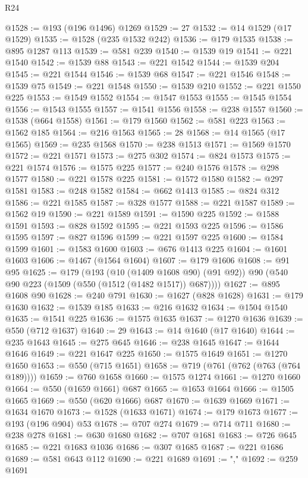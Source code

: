 \begin{lexlean}{R24}
\begin{coremodule}
@1528 := @193 (@196 @1496) @1269
@1529 := 27
@1532 := @14 @1529 (@17 @1529)
@1535 := @1528 (@235 @1532 @242)
@1536 := @179 @1535
@1538 := @895 @1287 @113
@1539 := @581 @239
@1540 := @1539 @19
@1541 := @221 @1540
@1542 := @1539 @88
@1543 := @221 @1542
@1544 := @1539 @204
@1545 := @221 @1544
@1546 := @1539 @68
@1547 := @221 @1546
@1548 := @1539 @75
@1549 := @221 @1548
@1550 := @1539 @210
@1552 := @221 @1550 @225
@1553 := @1549 @1552
@1554 := @1547 @1553
@1555 := @1545 @1554
@1556 := @1543 @1555
@1557 := @1541 @1556
@1558 := @238 @1557
@1560 := @1538 (@664 @1558)
@1561 := @179 @1560
@1562 := @581 @223
@1563 := @1562 @185
@1564 := @216 @1563
@1565 := 28
@1568 := @14 @1565 (@17 @1565)
@1569 := @235 @1568
@1570 := @238 @1513
@1571 := @1569 @1570
@1572 := @221 @1571
@1573 := @275 @302
@1574 := @824 @1573
@1575 := @221 @1574
@1576 := @1575 @225
@1577 := @240 @1576
@1578 := @298 @1577
@1580 := @221 @1578 @225
@1581 := @1572 @1580
@1582 := @297 @1581
@1583 := @248 @1582
@1584 := @662 @1413
@1585 := @824 @312
@1586 := @221 @1585
@1587 := @328 @1577
@1588 := @221 @1587
@1589 := @1562 @19
@1590 := @221 @1589
@1591 := @1590 @225
@1592 := @1588 @1591
@1593 := @828 @1592
@1595 := @221 @1593 @225
@1596 := @1586 @1595
@1597 := @827 @1596
@1599 := @221 @1597 @225
@1600 := @1584 @1599
@1601 := @1583 @1600
@1603 := @676 @1413 @225
@1604 := @1601 @1603
@1606 := @1467 (@1564 @1604)
@1607 := @179 @1606
@1608 := @91 @95
@1625 := @179
    (@193
      (@10 (@1409 @1608 @90) (@91 @92))
      @90
      (@540 @90 @223 (@1509 (@550 (@1512 (@1482 @1517)) @687))))
@1627 := @895 @1608 @90
@1628 := @240 @791
@1630 := @1627 (@828 @1628)
@1631 := @179 @1630
@1632 := @1539 @185
@1633 := @216 @1632
@1634 := @1504 @1540
@1635 := @1541 @225
@1636 := @1575 @1635
@1637 := @1270 @1636
@1639 := @550 (@712 @1637)
@1640 := 29
@1643 := @14 @1640 (@17 @1640)
@1644 := @235 @1643
@1645 := @275 @645
@1646 := @238 @1645
@1647 := @1644 @1646
@1649 := @221 @1647 @225
@1650 := @1575 @1649
@1651 := @1270 @1650
@1653 := @550 (@715 @1651)
@1658 := @719 (@761 (@762 (@763 (@764 @189))))
@1659 := @760 @1658
@1660 := @1575 @1274
@1661 := @1270 @1660
@1664 := @550 (@1659 @1661) @687
@1665 := @1653 @1664
@1666 := @1505 @1665
@1669 := @550 (@620 @1666) @687
@1670 := @1639 @1669
@1671 := @1634 @1670
@1673 := @1528 (@1633 @1671)
@1674 := @179 @1673
@1677 := @193 (@196 @904) @53
@1678 := @707 @274
@1679 := @714 @711
@1680 := @238 @278
@1681 := @630 @1680
@1682 := @707 @1681
@1683 := @726 @645
@1685 := @221 @1683 @1036
@1686 := @307 @1685
@1687 := @221 @1686
@1689 := @581 @643 @112
@1690 := @221 @1689
@1691 := ","
@1692 := @259 @1691

\end{coremodule}
\end{lexlean}
